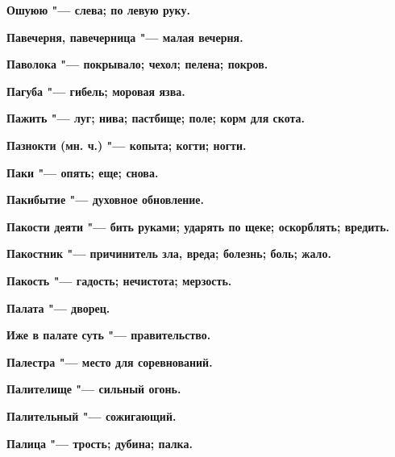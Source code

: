 \bfseries Ошуюю \normalfont{} "--- слева; по левую руку. 




 





\bfseries Павечерня, павечерница \normalfont{} "--- малая вечерня. 




\bfseries Паволока \normalfont{} "--- покрывало; чехол; пелена; покров. 




\bfseries Пагуба \normalfont{} "--- гибель; моровая язва. 




\bfseries Пажить \normalfont{} "--- луг; нива; пастбище; поле; корм для скота. 




\bfseries Пазнокти \normalfont{} (мн. ч.) "--- копыта; когти; ногти. 




\bfseries Паки \normalfont{} "--- опять; еще; снова. 




\bfseries Пакибытие \normalfont{} "--- духовное обновление. 




\bfseries Пакости деяти \normalfont{} "--- бить руками; ударять по щеке; оскорблять; вредить. 




\bfseries Пакостник \normalfont{} "--- причинитель зла, вреда; болезнь; боль; жало. 




\bfseries Пакость \normalfont{} "--- гадость; нечистота; мерзость. 




\bfseries Палата \normalfont{} "--- дворец. 




\bfseries Иже в палате суть \normalfont{} "--- правительство. 




\bfseries Палестра \normalfont{} "--- место для соревнований. 




\bfseries Палителище \normalfont{} "--- сильный огонь. 




\bfseries Палительный \normalfont{} "--- сожигающий. 




\bfseries Палица \normalfont{} "--- трость; дубина; палка. 




